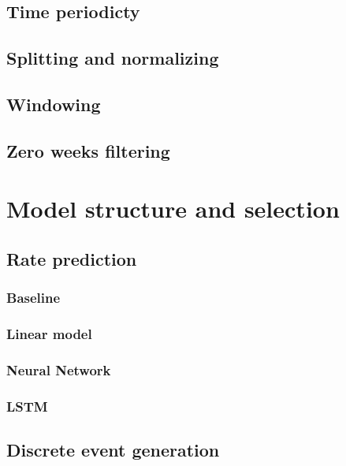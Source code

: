 \documentclass[10pt,conference,compsocconf]{IEEEtran}
\begin{document}
\subsection{Time periodicty}

\subsection{Splitting and normalizing}

\subsection{Windowing}

\subsection{Zero weeks filtering}


\section{Model structure and selection}

\subsection{Rate prediction}

\subsubsection{Baseline}

\subsubsection{Linear model}

\subsubsection{Neural Network}

\subsubsection{LSTM}

\subsection{Discrete event generation}
\end{document}
